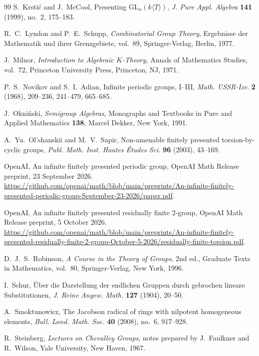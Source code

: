 \begin{thebibliography}{99}
S.~Krsti\'c and J.~McCool,
Presenting $\mathrm{GL}_n(k\langle T\rangle)$,
\emph{J. Pure Appl. Algebra} \textbf{141} (1999), no.~2, 175--183.

R.~C.~Lyndon and P.~E.~Schupp,
\emph{Combinatorial Group Theory},
Ergebnisse der Mathematik und ihrer Grenzgebiete, vol.~89,
Springer-Verlag, Berlin, 1977.

J.~Milnor,
\emph{Introduction to Algebraic $K$-Theory},
Annals of Mathematics Studies, vol.~72,
Princeton University Press, Princeton, NJ, 1971.

P.~S.~Novikov and S.~I.~Adian,
Infinite periodic groups, I--III,
\emph{Math. USSR-Izv.} \textbf{2} (1968), 209--236, 241--479, 665--685.

J.~Okni\'nski,
\emph{Semigroup Algebras},
Monographs and Textbooks in Pure and Applied Mathematics \textbf{138},
Marcel Dekker, New York, 1991.

A.~Yu.~Ol'shanskii and M.~V.~Sapir,
Non-amenable finitely presented torsion-by-cyclic groups,
\emph{Publ. Math. Inst. Hautes \'Etudes Sci.} \textbf{96} (2003), 43--169.

OpenAI,
An infinite finitely presented periodic group,
OpenAI Math Release preprint, 23 September 2026.
\url{https://github.com/openai/math/blob/main/preprints/An-infinite-finitely-presented-periodic-group-September-23-2026/paper.pdf}.

OpenAI,
An infinite finitely presented residually finite 2-group,
OpenAI Math Release preprint, 5 October 2026.
\url{https://github.com/openai/math/blob/main/preprints/An-infinite-finitely-presented-residually-finite-2-group-October-5-2026/residually-finite-torsion.pdf}.

D.~J.~S.~Robinson,
\emph{A Course in the Theory of Groups}, 2nd ed.,
Graduate Texts in Mathematics, vol.~80,
Springer-Verlag, New York, 1996.

I.~Schur,
\"Uber die Darstellung der endlichen Gruppen durch gebrochen lineare Substitutionen,
\emph{J. Reine Angew. Math.} \textbf{127} (1904), 20--50.

A.~Smoktunowicz,
The Jacobson radical of rings with nilpotent homogeneous elements,
\emph{Bull. Lond. Math. Soc.} \textbf{40} (2008), no.~6, 917--928.

R.~Steinberg,
\emph{Lectures on Chevalley Groups},
notes prepared by J.~Faulkner and R.~Wilson,
Yale University, New Haven, 1967.


\end{thebibliography}
